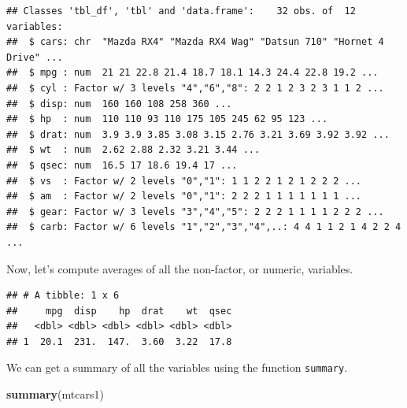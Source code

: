 \documentclass[12pt,letterpaperpaper,openany]{book}
\newenvironment{Shaded}{\begin{snugshade}}{\end{snugshade}}
\newcommand{\KeywordTok}[1]{\textcolor[rgb]{0.13,0.29,0.53}{\textbf{#1}}}
\newcommand{\NormalTok}[1]{#1}
\newcommand{\OperatorTok}[1]{\textcolor[rgb]{0.81,0.36,0.00}{\textbf{#1}}}
\newcommand{\StringTok}[1]{\textcolor[rgb]{0.31,0.60,0.02}{#1}}
\begin{document}
\begin{verbatim}
## Classes 'tbl_df', 'tbl' and 'data.frame':    32 obs. of  12 variables:
##  $ cars: chr  "Mazda RX4" "Mazda RX4 Wag" "Datsun 710" "Hornet 4 Drive" ...
##  $ mpg : num  21 21 22.8 21.4 18.7 18.1 14.3 24.4 22.8 19.2 ...
##  $ cyl : Factor w/ 3 levels "4","6","8": 2 2 1 2 3 2 3 1 1 2 ...
##  $ disp: num  160 160 108 258 360 ...
##  $ hp  : num  110 110 93 110 175 105 245 62 95 123 ...
##  $ drat: num  3.9 3.9 3.85 3.08 3.15 2.76 3.21 3.69 3.92 3.92 ...
##  $ wt  : num  2.62 2.88 2.32 3.21 3.44 ...
##  $ qsec: num  16.5 17 18.6 19.4 17 ...
##  $ vs  : Factor w/ 2 levels "0","1": 1 1 2 2 1 2 1 2 2 2 ...
##  $ am  : Factor w/ 2 levels "0","1": 2 2 2 1 1 1 1 1 1 1 ...
##  $ gear: Factor w/ 3 levels "3","4","5": 2 2 2 1 1 1 1 2 2 2 ...
##  $ carb: Factor w/ 6 levels "1","2","3","4",..: 4 4 1 1 2 1 4 2 2 4 ...
\end{verbatim}

Now, let's compute averages of all the non-factor, or numeric, variables.

\begin{Shaded}
\end{Shaded}

\begin{verbatim}
## # A tibble: 1 x 6
##     mpg  disp    hp  drat    wt  qsec
##   <dbl> <dbl> <dbl> <dbl> <dbl> <dbl>
## 1  20.1  231.  147.  3.60  3.22  17.8
\end{verbatim}

We can get a summary of all the variables using the function \texttt{summary}.

\begin{Shaded}
\begin{Highlighting}[]
\KeywordTok{summary}\NormalTok{(mtcars1)}
\end{Highlighting}
\end{Shaded}
\end{document}

